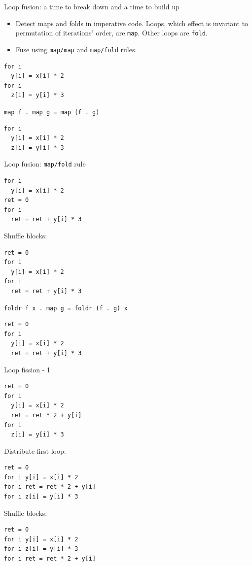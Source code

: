 \documentclass[handout]{beamer}
\begin{document}
\begin{frame}[fragile]{Loop fusion: a time to break down and a time to build up}

\begin{itemize}

\item Detect maps and folds in imperative code. Loops, which effect is invariant to permutation of iterations' order, are {\tt map}. Other loops are {\tt fold}.

\item Fuse using {\tt map/map} and {\tt map/fold} rules.
\end{itemize}

\begin{lstlisting}
for i
  y[i] = x[i] * 2
for i
  z[i] = y[i] * 3
\end{lstlisting}

\centerline{\tt map f . map g = map (f . g)}

\begin{lstlisting}
for i
  y[i] = x[i] * 2
  z[i] = y[i] * 3
\end{lstlisting}

\end{frame}

\begin{frame}[fragile]{Loop fusion: {\tt map/fold} rule}

\begin{lstlisting}
for i
  y[i] = x[i] * 2
ret = 0
for i
  ret = ret + y[i] * 3
\end{lstlisting}

Shuffle blocks:

\begin{lstlisting}
ret = 0
for i
  y[i] = x[i] * 2
for i
  ret = ret + y[i] * 3
\end{lstlisting}

\centerline{\tt foldr f x . map g = foldr (f . g) x}

\begin{lstlisting}
ret = 0
for i
  y[i] = x[i] * 2
  ret = ret + y[i] * 3
\end{lstlisting}

\end{frame}

\begin{frame}[fragile]{Loop fission - 1}

\begin{lstlisting}
ret = 0
for i
  y[i] = x[i] * 2
  ret = ret * 2 + y[i]
for i
  z[i] = y[i] * 3
\end{lstlisting}

Distribute first loop:

\begin{lstlisting}
ret = 0
for i y[i] = x[i] * 2
for i ret = ret * 2 + y[i]
for i z[i] = y[i] * 3
\end{lstlisting}

Shuffle blocks:

\begin{lstlisting}
ret = 0
for i y[i] = x[i] * 2
for i z[i] = y[i] * 3
for i ret = ret * 2 + y[i]
\end{lstlisting}

\end{frame}
\end{document}
